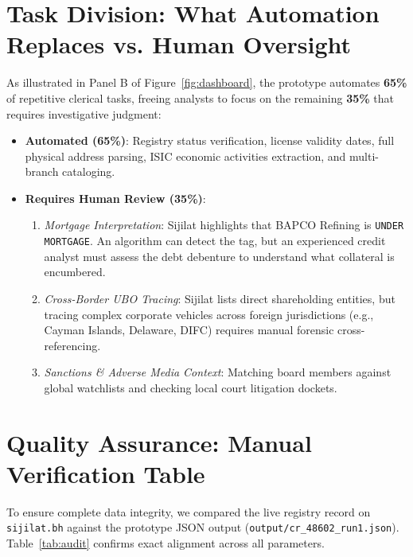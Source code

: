 \documentclass[11pt,a4paper]{article}
\begin{document}
\section{\color{primary}Task Division: What Automation Replaces vs. Human Oversight}

As illustrated in Panel B of Figure~\ref{fig:dashboard}, the prototype automates \textbf{65\%} of repetitive clerical tasks, freeing analysts to focus on the remaining \textbf{35\%} that requires investigative judgment:

\begin{itemize}[leftmargin=1.5em]
    \item \textbf{Automated (65\%)}: Registry status verification, license validity dates, full physical address parsing, ISIC economic activities extraction, and multi-branch cataloging.
    \item \textbf{Requires Human Review (35\%)}:
    \begin{enumerate}[label=(\alph*), itemsep=1pt]
        \item \emph{Mortgage Interpretation}: Sijilat highlights that BAPCO Refining is \texttt{UNDER MORTGAGE}. An algorithm can detect the tag, but an experienced credit analyst must assess the debt debenture to understand what collateral is encumbered.
        \item \emph{Cross-Border UBO Tracing}: Sijilat lists direct shareholding entities, but tracing complex corporate vehicles across foreign jurisdictions (e.g., Cayman Islands, Delaware, DIFC) requires manual forensic cross-referencing.
        \item \emph{Sanctions \& Adverse Media Context}: Matching board members against global watchlists and checking local court litigation dockets.
    \end{enumerate}
\end{itemize}

\section{\color{primary}Quality Assurance: Manual Verification Table}

To ensure complete data integrity, we compared the live registry record on \texttt{sijilat.bh} against the prototype JSON output (\texttt{output/cr\_48602\_run1.json}). Table~\ref{tab:audit} confirms exact alignment across all parameters.
\end{document}

